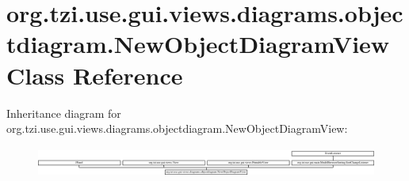 \hypertarget{classorg_1_1tzi_1_1use_1_1gui_1_1views_1_1diagrams_1_1objectdiagram_1_1_new_object_diagram_view}{\section{org.\-tzi.\-use.\-gui.\-views.\-diagrams.\-objectdiagram.\-New\-Object\-Diagram\-View Class Reference}
\label{classorg_1_1tzi_1_1use_1_1gui_1_1views_1_1diagrams_1_1objectdiagram_1_1_new_object_diagram_view}
}
Inheritance diagram for org.\-tzi.\-use.\-gui.\-views.\-diagrams.\-objectdiagram.\-New\-Object\-Diagram\-View\-:\begin{figure}[H]
\begin{center}
\leavevmode
\includegraphics[height=1.012048cm]{classorg_1_1tzi_1_1use_1_1gui_1_1views_1_1diagrams_1_1objectdiagram_1_1_new_object_diagram_view}
\end{center}
\end{figure}
